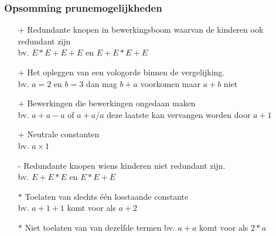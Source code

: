 \documentclass[Main.tex]{subfiles}
\begin{document}
\subsubsection*{Opsomming prunemogelijkheden}
\begin{itemize}
\item[+] Redundante knopen in bewerkingsboom waarvan de kinderen ook redundant zijn\\
bv. $E \ast E+E+E$ en $E+E \ast E+E$
\item[+] Het opleggen van een vologorde binnen de vergelijking.\\
	bv. $a=2$ en $b=3$ dan mag $b+a$ voorkomen maar $a+b$ niet
\item[+] Bewerkingen die bewerkingen ongedaan maken\\
	bv. $a+a-a$ of $a+a/a$ deze laatste kan vervangen worden door $a+1$
\item[+] Neutrale constanten\\
	bv. $a \times 1$
\item[-] Redundante knopen wiens kinderen niet redundant zijn.\\
	bv. $E+E \ast E$ en $E \ast E+E$
\item[$\ast$] Toelaten van slechts één losstaande constante \\
	bv. $a+1+1$ komt voor als $a+2$
\item[$\ast$] Niet toelaten van van dezelfde termen
	bv. $a+a$ komt voor als $2 \ast a$
\end{itemize}
\end{document}
